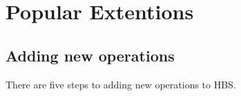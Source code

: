 
\section{Popular Extentions}
\label{sec:extentions}
\subsection{Adding new operations}
There are five steps to adding new operations to
HBS. 


